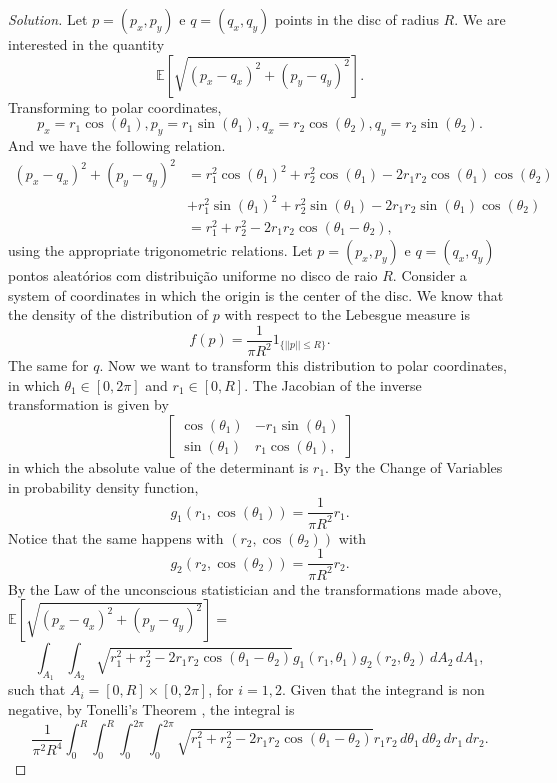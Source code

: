 \documentclass[a4paper,10pt, notitlepage]{report}
\newcommand{\ev}{\mathbb{E}}
\begin{document}
\begin{enumerate}
   \begin{proof}[Solution]
       Let $p = (p_x, p_y)$ e $q = (q_x, q_y)$ points in the disc of radius $R$.  We are interested
       in the quantity
       $$\ev\left[\sqrt{(p_x - q_x)^2 + (p_y - q_y)^2}\right].$$ Transforming
       to polar coordinates, 
       $$
       p_x = r_1\cos(\theta_1), p_y = r_1\sin(\theta_1), q_x = r_2\cos(\theta_2), q_y = r_2\sin(\theta_2).
       $$
       And we have the following relation. 
        \begin{equation*}
            \begin{split}
                (p_x - q_x)^2 + (p_y - q_y)^2 &= r_1^2\cos(\theta_1)^2 + r_2^2\cos(\theta_1) - 2r_1r_2\cos(\theta_1)\cos(\theta_2) \\ 
                &+ r_1^2\sin(\theta_1)^2 + r_2^2\sin(\theta_1) - 2r_1r_2\sin(\theta_1)\cos(\theta_2) \\ 
                &= r_1^2 + r_2^2 -2r_1r_2\cos(\theta_1 - \theta_2),
            \end{split}
        \end{equation*}
        using the appropriate trigonometric relations. Let $p = (p_x, p_y)$ e $q = (q_x, q_y)$ pontos aleatórios com
        distribuição uniforme no disco de raio $R$. Consider a system of
        coordinates in which the origin is the center of the disc. We know that the density
        of the distribution of $p$ with respect to the Lebesgue measure is 
        $$
        f(p) = \frac{1}{\pi R^2}1_{\{||p|| \le R\}}.
        $$
        The same for $q$. Now we want to transform this distribution to polar
        coordinates, in which $\theta_1 \in [0,2\pi]$ and $r_1 \in [0,R]$. The
        Jacobian of the inverse transformation is given by 
        $$
        \begin{bmatrix}
            \cos(\theta_1) & -r_1\sin(\theta_1) \\
            \sin(\theta_1) & r_1\cos(\theta_1),
        \end{bmatrix}
        $$
        in which the absolute value of the determinant is $r_1$. By the Change of Variables in probability density function, 
        $$
        g_1(r_1, \cos(\theta_1)) = \frac{1}{\pi R^2}r_1. 
        $$
        Notice that the same happens with $(r_2, \cos(\theta_2))$ with 
        $$
        g_2(r_2, \cos(\theta_2)) = \frac{1}{\pi R^2}r_2. 
        $$
        By the Law of the unconscious statistician and the transformations
        made above, $\ev\left[\sqrt{(p_x - q_x)^2 + (p_y - q_y)^2}\right] = $
        $$
        \int_{A_1} \int_{A_2} \sqrt{r_1^2 + r_2^2 -2r_1r_2\cos(\theta_1 - \theta_2)}g_1(r_1, \theta_1)g_2(r_2, \theta_2) \, dA_2 \, dA_1, 
        $$
        such that $A_i = [0,R] \times [0,2\pi]$, for $i=1,2$. Given that the
        integrand is non negative, by Tonelli's
        Theorem \cite[]{rosenthal2006first}, the integral is 
        $$
        \frac{1}{\pi^2 R^4}\int_{0}^{R}\int_{0}^{R}\int_{0}^{2\pi}\int_{0}^{2\pi}\sqrt{r_1^2 + r_2^2 - 2r_1r_2\cos(\theta_1 -\theta_2)}r_1r_2\,d\theta_1\,d\theta_2\,dr_1\,dr_2.
        $$
   \end{proof}


\end{enumerate}
\end{document}
